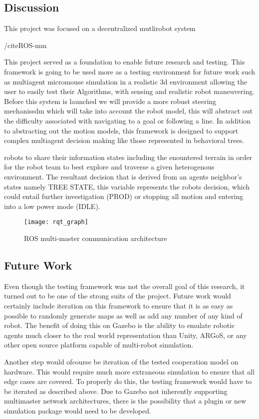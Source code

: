\subsection{Discussion}

This project was focused on a decentralized mutlirobot system

/cite{ROS-mm}

This project served as a foundation to enable future research and testing.
This framework is going to be used more as a testing environment for future work such
as multiagent micromouse simulation in a realistic 3d environment allowing the user to easily test
their Algorithms, with sensing and realistic robot maneuvering. Before this system is launched
we will provide a more robust steering mechanissdm which will take into account the robot model,
this will abstract out the difficulty associated with navigating to a goal or following a line.
In addition to abstracting out the motion models, this framework is designed to support complex
multiagent decision making like those represented in behavioral trees.

robots to share their information states including the enountered
terrain in order for the robot team to best explore and traverse a
given heterogenous environment. The resultant decision that is derived
from an agents neighbor's states namely TREE STATE, this variable
represents the robots decision, which could entail further investigation
(PROD) or stopping all motion and entering into a low power mode (IDLE).



\begin{figure}[H]
  \centering
    \texttt{[image: rqt\_graph]}
  \caption{ROS multi-master communication architecture}
  \label{fig:something3}
\end{figure}


\subsection{Future Work}

Even though the testing framework was not the overall goal of this research,
it turned out to be one of the strong suits of the project. Future work would certainly
include iteration on this framework to ensure that it is as easy as possible to
randomly generate maps as well as add any number of any kind of robot. The benefit
of doing this on Gazebo is the ability to emulate robotic agents much closer to the
real world representation than Unity, ARGoS, or any other open source platform
capable of multi-robot simulation.

Another step would ofcourse be iteration of the tested cooperation model on hardware.
This would require much more extraneous simulation to ensure that all edge cases are
covered. To properly do this, the testing framework would have to be iterated as
described above. Due to Gazebo not inherently supporting multimaster network architectures,
there is the possibility that a plugin or new simulation package would need to be
developed.
